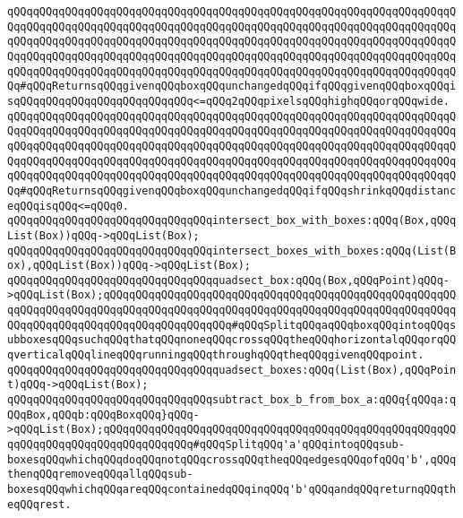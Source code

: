 \verb|qQQqqQQqqQQqqQQqqQQqqQQqqQQqqQQqqQQqqQQqqQQqqQQqqQQqqQQqqQQqqQQqqQQqqQQqqQQqqQQqqQQqqQQqqQQqqQQqqQQqqQQqqQQqqQQqqQQqqQQqqQQqqQQqqQQqqQQqqQQqqQQqqQQqqQQqqQQqqQQqqQQqqQQqqQQqqQQqqQQqqQQqqQQqqQQqqQQqqQQqqQQqqQQqqQQqqQQqqQQqqQQqqQQqqQQqqQQqqQQqqQQqqQQqqQQqqQQqqQQqqQQqqQQqqQQqqQQqqQQqqQQqqQQqqQQqqQQqqQQqqQQqqQQqqQQqqQQqqQQqqQQqqQQqqQQqqQQqqQQqqQQqqQQqqQQq#qQQqReturnsqQQqgivenqQQqboxqQQqunchangedqQQqifqQQqgivenqQQqboxqQQqisqQQqqQQqqQQqqQQqqQQqqQQqqQQq<=qQQq2qQQqpixelsqQQqhighqQQqorqQQqwide.|\newline
\verb|qQQqqQQqqQQqqQQqqQQqqQQqqQQqqQQqqQQqqQQqqQQqqQQqqQQqqQQqqQQqqQQqqQQqqQQqqQQqqQQqqQQqqQQqqQQqqQQqqQQqqQQqqQQqqQQqqQQqqQQqqQQqqQQqqQQqqQQqqQQqqQQqqQQqqQQqqQQqqQQqqQQqqQQqqQQqqQQqqQQqqQQqqQQqqQQqqQQqqQQqqQQqqQQqqQQqqQQqqQQqqQQqqQQqqQQqqQQqqQQqqQQqqQQqqQQqqQQqqQQqqQQqqQQqqQQqqQQqqQQqqQQqqQQqqQQqqQQqqQQqqQQqqQQqqQQqqQQqqQQqqQQqqQQqqQQqqQQqqQQqqQQqqQQqqQQq#qQQqReturnsqQQqgivenqQQqboxqQQqunchangedqQQqifqQQqshrinkqQQqdistanceqQQqisqQQq<=qQQq0.|\newline
\newline
\newline
\newline
\verb|qQQqqQQqqQQqqQQqqQQqqQQqqQQqqQQqintersect_box_with_boxes:qQQq(Box,qQQqList(Box))qQQq->qQQqList(Box);|\newline
\newline
\verb|qQQqqQQqqQQqqQQqqQQqqQQqqQQqqQQqintersect_boxes_with_boxes:qQQq(List(Box),qQQqList(Box))qQQq->qQQqList(Box);|\newline
\newline
\verb|qQQqqQQqqQQqqQQqqQQqqQQqqQQqqQQqquadsect_box:qQQq(Box,qQQqPoint)qQQq->qQQqList(Box);qQQqqQQqqQQqqQQqqQQqqQQqqQQqqQQqqQQqqQQqqQQqqQQqqQQqqQQqqQQqqQQqqQQqqQQqqQQqqQQqqQQqqQQqqQQqqQQqqQQqqQQqqQQqqQQqqQQqqQQqqQQqqQQqqQQqqQQqqQQqqQQqqQQqqQQqqQQqqQQq#qQQqSplitqQQqaqQQqboxqQQqintoqQQqsubboxesqQQqsuchqQQqthatqQQqnoneqQQqcrossqQQqtheqQQqhorizontalqQQqorqQQqverticalqQQqlineqQQqrunningqQQqthroughqQQqtheqQQqgivenqQQqpoint.|\newline
\newline
\verb|qQQqqQQqqQQqqQQqqQQqqQQqqQQqqQQqquadsect_boxes:qQQq(List(Box),qQQqPoint)qQQq->qQQqList(Box);|\newline
\newline
\verb|qQQqqQQqqQQqqQQqqQQqqQQqqQQqqQQqsubtract_box_b_from_box_a:qQQq{qQQqa:qQQqBox,qQQqb:qQQqBoxqQQq}qQQq->qQQqList(Box);qQQqqQQqqQQqqQQqqQQqqQQqqQQqqQQqqQQqqQQqqQQqqQQqqQQqqQQqqQQqqQQqqQQqqQQqqQQqqQQqqQQq#qQQqSplitqQQq'a'qQQqintoqQQqsub-boxesqQQqwhichqQQqdoqQQqnotqQQqcrossqQQqtheqQQqedgesqQQqofqQQq'b',qQQqthenqQQqremoveqQQqallqQQqsub-boxesqQQqwhichqQQqareqQQqcontainedqQQqinqQQq'b'qQQqandqQQqreturnqQQqtheqQQqrest.|\newline
